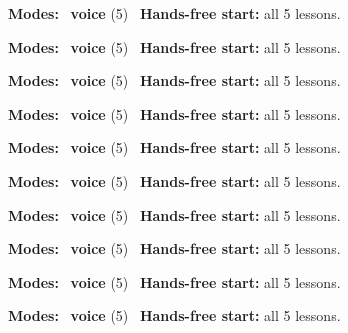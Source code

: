 \expandafter\def\csname hlchaptermodality57\endcsname{%
  {\small\noindent
    \textbf{Modes:} \hlvoicesign{}~\textbf{voice} (5)\quad
    \hlvoicesign{}~\textbf{Hands-free start:} all 5 lessons.%
    \par}\medskip
}

\expandafter\def\csname hlchaptermodality58\endcsname{%
  {\small\noindent
    \textbf{Modes:} \hlvoicesign{}~\textbf{voice} (5)\quad
    \hlvoicesign{}~\textbf{Hands-free start:} all 5 lessons.%
    \par}\medskip
}

\expandafter\def\csname hlchaptermodality59\endcsname{%
  {\small\noindent
    \textbf{Modes:} \hlvoicesign{}~\textbf{voice} (5)\quad
    \hlvoicesign{}~\textbf{Hands-free start:} all 5 lessons.%
    \par}\medskip
}

\expandafter\def\csname hlchaptermodality60\endcsname{%
  {\small\noindent
    \textbf{Modes:} \hlvoicesign{}~\textbf{voice} (5)\quad
    \hlvoicesign{}~\textbf{Hands-free start:} all 5 lessons.%
    \par}\medskip
}

\expandafter\def\csname hlchaptermodality61\endcsname{%
  {\small\noindent
    \textbf{Modes:} \hlvoicesign{}~\textbf{voice} (5)\quad
    \hlvoicesign{}~\textbf{Hands-free start:} all 5 lessons.%
    \par}\medskip
}

\expandafter\def\csname hlchaptermodality62\endcsname{%
  {\small\noindent
    \textbf{Modes:} \hlvoicesign{}~\textbf{voice} (5)\quad
    \hlvoicesign{}~\textbf{Hands-free start:} all 5 lessons.%
    \par}\medskip
}

\expandafter\def\csname hlchaptermodality63\endcsname{%
  {\small\noindent
    \textbf{Modes:} \hlvoicesign{}~\textbf{voice} (5)\quad
    \hlvoicesign{}~\textbf{Hands-free start:} all 5 lessons.%
    \par}\medskip
}

\expandafter\def\csname hlchaptermodality64\endcsname{%
  {\small\noindent
    \textbf{Modes:} \hlvoicesign{}~\textbf{voice} (5)\quad
    \hlvoicesign{}~\textbf{Hands-free start:} all 5 lessons.%
    \par}\medskip
}

\expandafter\def\csname hlchaptermodality65\endcsname{%
  {\small\noindent
    \textbf{Modes:} \hlvoicesign{}~\textbf{voice} (5)\quad
    \hlvoicesign{}~\textbf{Hands-free start:} all 5 lessons.%
    \par}\medskip
}

\expandafter\def\csname hlchaptermodality66\endcsname{%
  {\small\noindent
    \textbf{Modes:} \hlvoicesign{}~\textbf{voice} (5)\quad
    \hlvoicesign{}~\textbf{Hands-free start:} all 5 lessons.%
    \par}\medskip
}
